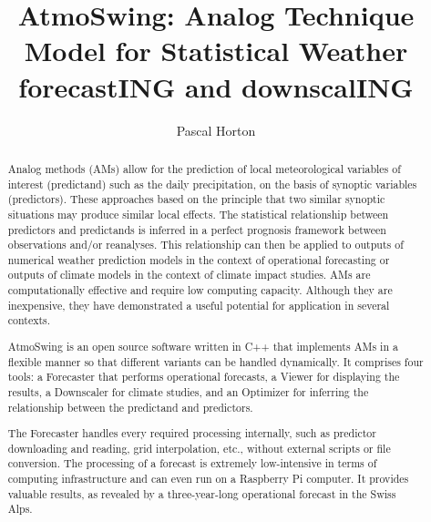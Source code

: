 \documentclass[review]{elsarticle}
\begin{document}
	
\begin{frontmatter}
	
	\title{AtmoSwing: Analog Technique Model for Statistical Weather forecastING and downscalING}
	
	
	\author[unibe,unil,terranum]{Pascal Horton}
	
	
	\address[unibe]{University of Bern, Oeschger Centre for Climate Change Research, Institute of Geography, Bern, Switzerland}
	\address[unil]{University of Lausanne, Institute of Earth Sciences, Lausanne, Switzerland}
	\address[terranum]{Terranum SARL, Bussigny, Switzerland}
	
	
	
	\begin{abstract}
		Analog methods (AMs) allow for the prediction of local meteorological variables of interest (predictand) such as the daily precipitation, on the basis of synoptic variables (predictors). These approaches based on the principle that two similar synoptic situations may produce similar local effects. The statistical relationship between predictors and predictands is inferred in a perfect prognosis framework between observations and/or reanalyses. This relationship can then be applied to outputs of numerical weather prediction models in the context of operational forecasting or outputs of climate models in the context of climate impact studies. AMs are computationally effective and require low computing capacity. Although they are inexpensive, they have demonstrated a useful potential for application in several contexts. 
		
		AtmoSwing is an open source software written in C++ that implements AMs in a flexible manner so that different variants can be handled dynamically. It comprises four tools: a Forecaster that performs operational forecasts, a Viewer for displaying the results, a Downscaler for climate studies, and an Optimizer for inferring the relationship between the predictand and predictors. 
		
		The Forecaster handles every required processing internally, such as predictor downloading and reading, grid interpolation, etc., without external scripts or file conversion. The processing of a forecast is extremely low-intensive in terms of computing infrastructure and can even run on a Raspberry Pi computer. It provides valuable results, as revealed by a three-year-long operational forecast in the Swiss Alps. 
		

\end{abstract}
\end{frontmatter}
\end{document}
